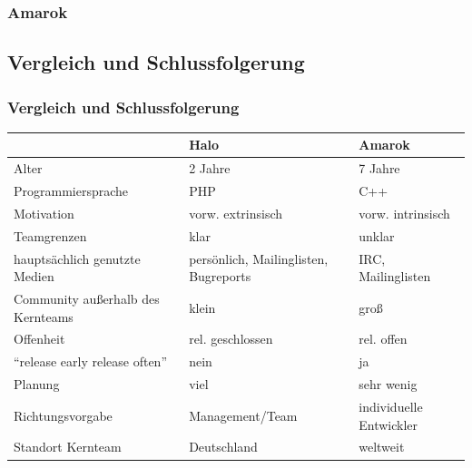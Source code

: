 \documentclass{beamer}
\begin{document}
\begin{frame}
\frametitle{Amarok}
\begin{center}
\end{center}
\end{frame}

\subsection{Vergleich und Schlussfolgerung}

\begin{frame}
\frametitle{Vergleich und Schlussfolgerung}
\begin{tabularx}{\textwidth}{|X|X|X|}
\hline
 & Halo & Amarok \\
\hline \hline
Alter & 2 Jahre & 7 Jahre \\
\hline
Programmiersprache & PHP & C++ \\
\hline
Motivation & vorw. extrinsisch & vorw. intrinsisch \\
\hline
Teamgrenzen & klar & unklar\\
\hline
haupts\"achlich genutzte Medien & pers\"onlich, Mailinglisten, Bugreports & IRC, Mailinglisten \\
\hline
Community au\ss erhalb des Kernteams & klein & gro\ss \\
\hline
Offenheit & rel. geschlossen & rel. offen \\
\hline
``release early release often'' & nein & ja \\
\hline
Planung & viel & sehr wenig \\
\hline
Richtungsvorgabe & Management/Team & individuelle Entwickler \\
\hline
Standort Kernteam & Deutschland & weltweit \\
\hline
\end{tabularx}
\end{frame}
\end{document}
